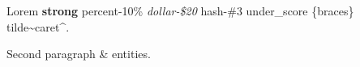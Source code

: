 Lorem \textbf{strong} percent-10\% \emph{dollar-\$20} hash-\#3 under\_score \{braces\} tilde\textasciitilde caret\textasciicircum.

Second paragraph \& entities.

